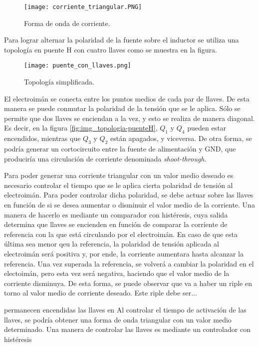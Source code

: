 \begin{figure}[H]
	\centering
	\texttt{[image: corriente\_triangular.PNG]}
	\caption{Forma de onda de corriente.}
	\label{fig:img_corriente_triangular_2}
\end{figure}


\noindent Para lograr alternar la polaridad de la fuente sobre el inductor se utiliza una topología en puente H con cuatro llaves como se  muestra en la figura.

\begin{figure}[H]
	\centering
	\texttt{[image: puente\_con\_llaves.png]}
	\caption{Topología simplificada.}
	\label{fig:img_topologia_simplificada}
\end{figure} 

El electroimán se conecta entre los puntos medios de cada par de llaves. De esta manera se puede conmutar la polaridad de la tensión que se le aplica. Sólo se permite que dos llaves se enciendan a la vez, y esto se realiza de manera diagonal. Es decir, en la figura \ref{fig:img_topologia-puenteH}, $Q_1$ y $Q_4$ pueden estar encendidos, mientras que $Q_3$ y $Q_2$ están apagados, y viceversa. De otra forma, se podría generar un cortocircuito entre la fuente de alimentación y GND, que produciría una circulación de corriente denominada \textsl{shoot-through}.

Para poder generar una corriente triangular con un valor medio deseado es necesario controlar el tiempo que se le aplica cierta polaridad de tensión al electroimán. Para poder controlar dicha polaridad, se debe actuar sobre las llaves en función de si se desea aumentar o disminuir el valor medio de la corriente.  Una manera de hacerlo es mediante un comparador con histéresis, cuya salida determina que llaves se encienden en función de comparar la corriente de referencia con la que está circulando por el electroimán. En caso de que esta última sea menor qeu la referencia, la polaridad de tensión aplicada al electroimán será positiva y, por ende, la corriente aumentara hasta alcanzar la referencia. Una vez superada la referencia, se volverá a cambiar la polaridad en el electoimán, pero esta vez será negativa, haciendo que el valor medio de la corriente disminuya. De esta forma, se puede observar que va a haber un riple en torno al valor medio de corriente deseado.  Este riple debe ser...

permanecen encendidas las llaves en 
Al controlar el tiempo de activación de las llaves, se podría obtener una forma de onda triangular con un valor medio determinado. Una manera de controlar las llaves es mediante un controlador con histéresis

